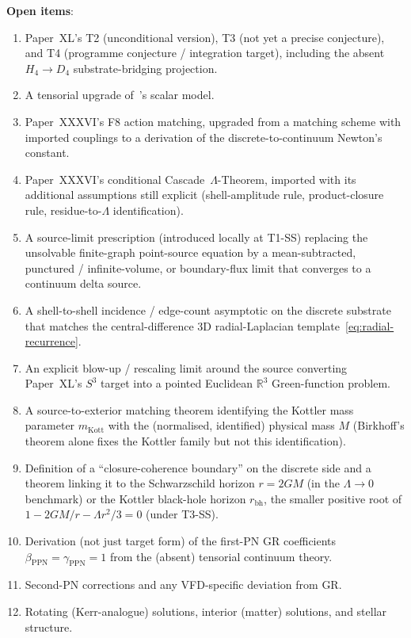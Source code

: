 \documentclass[12pt]{article}
\theoremstyle{definition}
\theoremstyle{remark}
\begin{document}
\textbf{Open items}:
\begin{enumerate}
\item Paper~XL's T2 (unconditional version), T3 (not yet a precise conjecture), and T4 (programme conjecture / integration target), including the absent $H_4 \to D_4$ substrate-bridging projection.
\item A tensorial upgrade of~\citep{SmartXXVII}'s scalar model.
\item Paper~XXXVI's F8 action matching, upgraded from a matching scheme with imported couplings to a derivation of the discrete-to-continuum Newton's constant.
\item Paper~XXXVI's conditional Cascade~$\Lambda$-Theorem, imported with its additional assumptions still explicit (shell-amplitude rule, product-closure rule, residue-to-$\Lambda$ identification).
\item A source-limit prescription (introduced locally at T1-SS) replacing the unsolvable finite-graph point-source equation by a mean-subtracted, punctured / infinite-volume, or boundary-flux limit that converges to a continuum delta source.
\item A shell-to-shell incidence / edge-count asymptotic on the discrete substrate that matches the central-difference 3D radial-Laplacian template~\eqref{eq:radial-recurrence}.
\item An explicit blow-up / rescaling limit around the source converting Paper~XL's $S^3$ target into a pointed Euclidean $\mathbb{R}^3$ Green-function problem.
\item A source-to-exterior matching theorem identifying the Kottler mass parameter $m_{\mathrm{Kott}}$ with the (normalised, identified) physical mass $M$ (Birkhoff's theorem alone fixes the Kottler family but not this identification).
\item Definition of a ``closure-coherence boundary'' on the discrete side and a theorem linking it to the Schwarzschild horizon $r = 2GM$ (in the $\Lambda \to 0$ benchmark) or the Kottler black-hole horizon $r_{\mathrm{bh}}$, the smaller positive root of $1 - 2GM/r - \Lambda r^2/3 = 0$ (under T3-SS).
\item Derivation (not just target form) of the first-PN GR coefficients $\beta_{\mathrm{PPN}} = \gamma_{\mathrm{PPN}} = 1$ from the (absent) tensorial continuum theory.
\item Second-PN corrections and any VFD-specific deviation from GR.
\item Rotating (Kerr-analogue) solutions, interior (matter) solutions, and stellar structure.
\end{enumerate}
\end{document}
